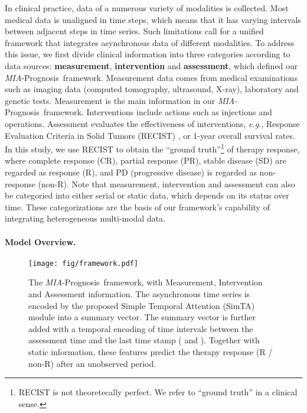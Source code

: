 \documentclass[runningheads]{llncs}
\newcommand{\eg}{\textit{e.g.}}
\newcommand{\miap}{\emph{MIA}-Prognosis}
\begin{document}
	In clinical practice, data of a numerous variety of modalities is collected. Most medical data is unaligned in time steps, which means that it has varying intervals between adjacent steps in time series. Such limitations call for a unified framework that integrates asynchronous data of different modalities. To address this issue, we first divide clinical information into three categories according to data sources: \textbf{measurement}, \textbf{intervention} and \textbf{assessment}, which defined our \miap~framework. Measurement data comes from medical examinations such as imaging data (computed tomography, ultrasound, X-ray), laboratory and genetic tests. Measurement is the main information in our \miap~framework. Interventions include actions such as injections and operations. Assessment evaluates the effectiveness of interventions, \eg, Response Evaluation Criteria in Solid Tumors (RECIST) \cite{Eisenhauer2009NewRE}, or 1-year overall survival rates. In this study, we use RECIST to obtain the ``ground truth''\footnote{RECIST is not theoretecally perfect. We refer to ``ground truth'' in a clinical sense.} of therapy response, where complete response (CR), partial response (PR), stable disease (SD) are regarded as response (R), and PD (progressive disease) is regarded as non-response (non-R). Note that measurement, intervention and assessment can also be categoried into either serial or static data, which depends on its status over time. These categorizations are the basis of our framework's capability of integrating heterogeneous multi-modal data.

\paragraph{\textbf{Model Overview.}}

\begin{figure}[tb]
	\texttt{[image: fig/framework.pdf]}
	\caption{The \miap~framework, with Measurement, Intervention and Assessment information. The asynchronous time series is encoded by the proposed Simple Temporal Attention (SimTA) module into a summary vector. The summary vector is further added with a temporal encoding of time intervals between the assessment time and the last time stamp ( and ). Together with static information, these features predict the therapy response (R / non-R) after an unobserved period.} \label{fig:framework}
\end{figure}
\end{document}
